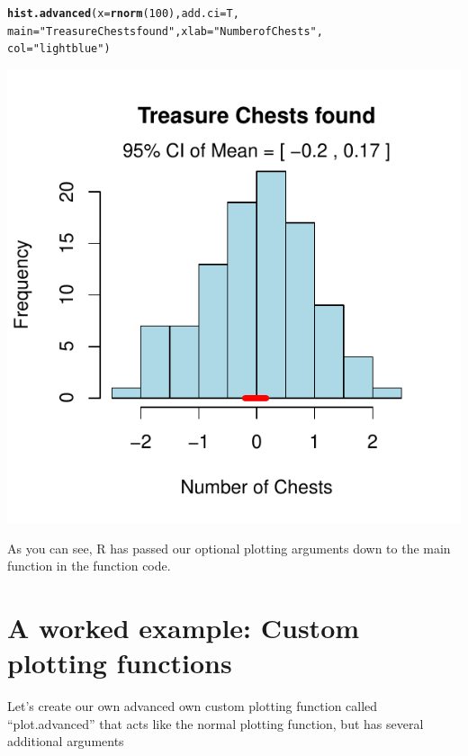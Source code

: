 \documentclass{tufte-book}\usepackage[]{graphicx}\usepackage[]{color}
\makeatletter
\def\maxwidth{ %
  \ifdim\Gin@nat@width>\linewidth
    \linewidth
  \else
    \Gin@nat@width
  \fi
}
\newcommand{\hlnum}[1]{\textcolor[rgb]{0.686,0.059,0.569}{#1}}%
\newcommand{\hlstr}[1]{\textcolor[rgb]{0.192,0.494,0.8}{#1}}%
\newcommand{\hlstd}[1]{\textcolor[rgb]{0.345,0.345,0.345}{#1}}%
\newcommand{\hlkwc}[1]{\textcolor[rgb]{0.333,0.667,0.333}{#1}}%
\newcommand{\hlkwd}[1]{\textcolor[rgb]{0.737,0.353,0.396}{\textbf{#1}}}%
\newenvironment{kframe}{%
 \def\at@end@of@kframe{}%
 \ifinner\ifhmode%
  \def\at@end@of@kframe{\end{minipage}}%
  \begin{minipage}{\columnwidth}%
 \fi\fi%
 \def\FrameCommand##1{\hskip\@totalleftmargin \hskip-\fboxsep
 \colorbox{shadecolor}{##1}\hskip-\fboxsep
     \hskip-\linewidth \hskip-\@totalleftmargin \hskip\columnwidth}%
 \MakeFramed {\advance\hsize-\width
   \@totalleftmargin\z@ \linewidth\hsize
   \@setminipage}}%
 {\par\unskip\endMakeFramed%
 \at@end@of@kframe}
\newenvironment{knitrout}{}{} %
\makeatother
\begin{document}
\begin{footnotesize}
\begin{knitrout}
\color{fgcolor}\begin{kframe}
\begin{alltt}
\hlkwd{hist.advanced}\hlstd{(}\hlkwc{x} \hlstd{=} \hlkwd{rnorm}\hlstd{(}\hlnum{100}\hlstd{),} \hlkwc{add.ci} \hlstd{= T,}
              \hlkwc{main} \hlstd{=} \hlstr{"Treasure Chests found"}\hlstd{,} \hlkwc{xlab} \hlstd{=} \hlstr{"Number of Chests"}\hlstd{,}
              \hlkwc{col} \hlstd{=} \hlstr{"lightblue"}\hlstd{)}
\end{alltt}
\end{kframe}
\includegraphics[width=\maxwidth]{figure/unnamed-chunk-286-1} 

\end{knitrout}

As you can see, R has passed our optional plotting arguments down to the main  function in the function code. 

\section{A worked example: Custom plotting functions}

Let's create our own advanced own custom plotting function called ``plot.advanced'' that acts like the normal plotting function, but has several additional arguments


\end{footnotesize}
\end{document}
